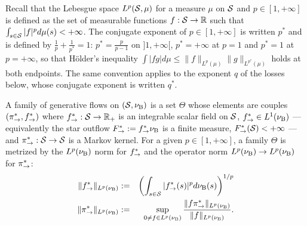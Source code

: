     Recall that the Lebesgue space $L^p(\mathcal S,\mu)$ for a measure $\mu$ on $\mathcal S$  and $p\in [1,+\infty]$ is defined as the set of measurable functions $f:\mathcal S \rightarrow \mathbb R$ such that $\int_{s\in \mathcal S}|f|^pd\mu(s)<+\infty$. The conjugate exponent of $p\in[1,+\infty]$ is written $p^*$ and is defined by $\frac1p+\frac1{p^*}=1$: $p^*=\frac{p}{p-1}$ on $]1,+\infty[$, $p^*=+\infty$ at $p=1$ and $p^*=1$ at $p=+\infty$, so that H\"older's inequality $\int|fg|d\mu\leq\|f\|_{L^p(\mu)}\|g\|_{L^{p^*}(\mu)}$ holds at both endpoints. The same convention applies to the exponent $q$ of the losses below, whose conjugate exponent is written $q^*$.

A family of generative flows on $(\mathcal S,\nu_{\mathrm{B}})$ is a set $\Theta$ whose elements are couples $(\pi_{\rightarrow}^*,f^*_{\rightarrow})$ where $f^*_{\rightarrow} : \mathcal S \rightarrow \mathbb R_+$  is an integrable scalar field on $\mathcal S$, $f^*_{\rightarrow}\in L^1(\nu_{\mathrm{B}})$ --- equivalently the star outflow $F^*_{\rightarrow}:=f^*_{\rightarrow}\nu_{\mathrm{B}}$ is a finite measure, $F^*_{\rightarrow}(\mathcal S)<+\infty$ --- and $\pi_{\rightarrow}^*:\mathcal S\rightarrow \mathcal S$ is a Markov kernel.
For a given $p\in [1,+\infty]$, a family $\Theta$ is metrized by the $L^p(\nu_{\mathrm{B}})$ norm for $f^*_{\rightarrow}$ and the operator norm $L^p(\nu_{\mathrm{B}})\rightarrow L^p(\nu_{\mathrm{B}})$ for $\pi_{\rightarrow}^*$:
\begin{eqnarray}
    \|f^*_{\rightarrow}\|_{L^p(\nu_{\mathrm{B}})} &:=& \left(\int_{s\in \mathcal S} |f^*_{\rightarrow}(s)|^pd\nu_{\mathrm{B}}(s)\right)^{1/p} \\
    \|\pi_{\rightarrow}^*\|_{L^p(\nu_{\mathrm{B}})} &:=& \sup_{0\neq f\in L^p(\nu_{\mathrm{B}})} \frac{\|f\pi_{\rightarrow}^*\|_{L^p(\nu_{\mathrm{B}})}}{\|f\|_{L^p(\nu_{\mathrm{B}})}}.
\end{eqnarray}
